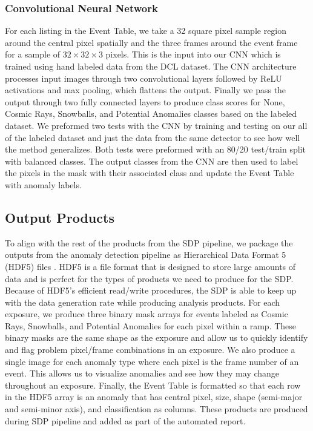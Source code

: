 \subsubsection{Convolutional Neural Network}
\label{rst/sec:CNN}
For each listing in the Event Table, we take a 32 square pixel sample region around the central pixel spatially and the three frames around the event frame for a sample of $32 \times 32  \times 3$ pixels. 
This is the input into our CNN which is trained using hand labeled data from the DCL dataset. 
The CNN architecture processes input images through two convolutional layers followed by ReLU activations and max pooling, which flattens the output.
Finally we pass the output through two fully connected layers to produce class scores for None, Cosmic Rays, Snowballs, and Potential Anomalies classes based on the labeled dataset.
We preformed two tests with the CNN by training and testing on our all of the labeled dataset and just the data from the same detector to see how well the method generalizes. 
Both tests were preformed with an 80/20 test/train split with balanced classes. 
The output classes from the CNN are then used to label the pixels in the mask with their associated class and update the Event Table with anomaly labels. 
\subsection{Output Products}
To align with the rest of the products from the SDP pipeline, we package the outputs from the anomaly detection pipeline as Hierarchical Data Format 5 (HDF5) files \parencite{The_HDF_Group_Hierarchical_Data_Format}.
HDF5 is a file format that is designed to store large amounts of data and is perfect for the types of products we need to produce for the SDP.
Because of HDF5's efficient read/write procedures, the SDP is able to keep up with the data generation rate while producing analysis products. 
For each exposure, we produce three binary mask arrays for events labeled as Cosmic Rays, Snowballs, and Potential Anomalies for each pixel within a ramp. 
These binary masks are the same shape as the exposure and allow us to quickly identify and flag problem pixel/frame combinations in an exposure. 
We also produce a single image for each anomaly type where each pixel is the frame number of an event. 
This allows us to visualize anomalies and see how they may change throughout an exposure.
Finally, the Event Table is formatted so that each row in the HDF5 array is an anomaly that has central pixel, size, shape (semi-major and semi-minor axis), and classification as columns. 
These products are produced during SDP pipeline and added as part of the automated report. 
